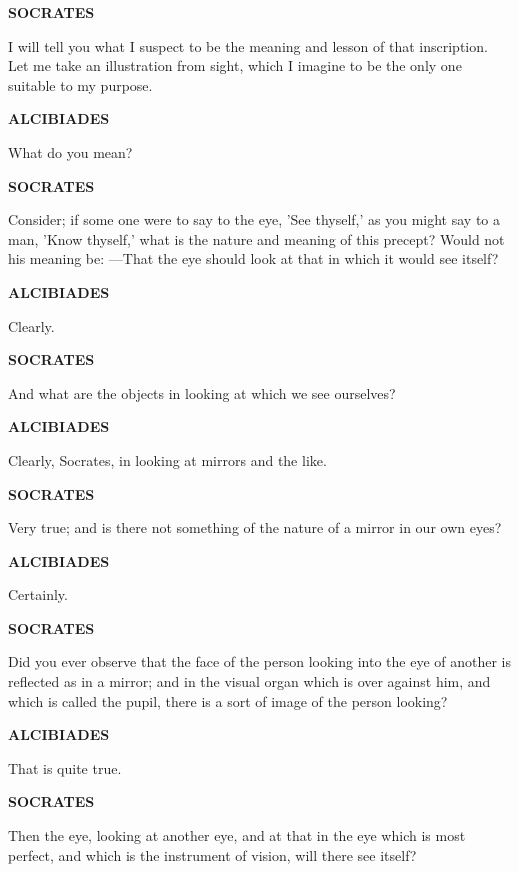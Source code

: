 \documentclass[11pt,letter]{article}
\begin{document}
\par \textbf{SOCRATES}
\par   I will tell you what I suspect to be the meaning and lesson of that inscription. Let me take an illustration from sight, which I imagine to be the only one suitable to my purpose.

\par \textbf{ALCIBIADES}
\par   What do you mean?

\par \textbf{SOCRATES}
\par   Consider; if some one were to say to the eye, 'See thyself,' as you might say to a man, 'Know thyself,' what is the nature and meaning of this precept? Would not his meaning be: —That the eye should look at that in which it would see itself?

\par \textbf{ALCIBIADES}
\par   Clearly.

\par \textbf{SOCRATES}
\par   And what are the objects in looking at which we see ourselves?

\par \textbf{ALCIBIADES}
\par   Clearly, Socrates, in looking at mirrors and the like.

\par \textbf{SOCRATES}
\par   Very true; and is there not something of the nature of a mirror in our own eyes?

\par \textbf{ALCIBIADES}
\par   Certainly.

\par \textbf{SOCRATES}
\par   Did you ever observe that the face of the person looking into the eye of another is reflected as in a mirror; and in the visual organ which is over against him, and which is called the pupil, there is a sort of image of the person looking?

\par \textbf{ALCIBIADES}
\par   That is quite true.

\par \textbf{SOCRATES}
\par   Then the eye, looking at another eye, and at that in the eye which is most perfect, and which is the instrument of vision, will there see itself?
\end{document}
